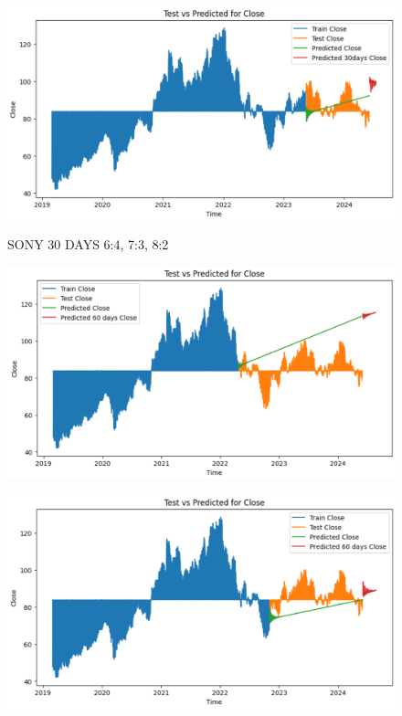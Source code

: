 \documentclass{article}
\begin{document}
\begin{multicols}{2}
\begin{figure}[H]
\begin{minipage}{0.15\textwidth}
    \label{fig:2}
    \end{minipage}%
    \begin{minipage}{0.15\textwidth}
    \centering
    \includegraphics[width=1\textwidth]{Image/VARMA/SONY/8_2/30.png}

    \label{fig:3}
    \end{minipage}
    \caption{SONY 30 DAYS  6:4, 7:3, 8:2 }
\end{figure}

\begin{figure}[H]
    \centering
    \begin{minipage}{0.15\textwidth}
    \centering
    \includegraphics[width=1\textwidth]{Image/VARMA/SONY/6_4/60.png}
   
    \label{fig:1}
    \end{minipage}%
    \begin{minipage}{0.15\textwidth}
    \centering
    \includegraphics[width=1\textwidth]{Image/VARMA/SONY/7_3/60.png}
  

\end{minipage}
\end{figure}
\end{multicols}
\end{document}
